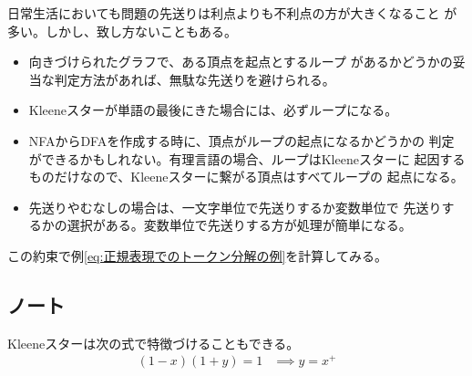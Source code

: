 {	\begin{todo}[先送り戦略]\label{todo:先送り戦略} %
		日常生活においても問題の先送りは利点よりも不利点の方が大きくなること
		が多い。しかし、致し方ないこともある。
		\begin{itemize}\setlength{\itemsep}{-1mm} %
			\item 向きづけられたグラフで、ある頂点を起点とするループ
			があるかどうかの妥当な判定方法があれば、無駄な先送りを避けられる。
			\item Kleeneスターが単語の最後にきた場合には、必ずループになる。
			\item NFAからDFAを作成する時に、頂点がループの起点になるかどうかの
			判定ができるかもしれない。有理言語の場合、ループはKleeneスターに
			起因するものだけなので、Kleeneスターに繋がる頂点はすべてループの
			起点になる。
			\item 先送りやむなしの場合は、一文字単位で先送りするか変数単位で
			先送りするかの選択がある。変数単位で先送りする方が処理が簡単になる。
		\end{itemize} %
	\end{todo} %

	この約束で例\eqref{eq:正規表現でのトークン分解の例}を計算してみる。
\subsection{ノート}\label{s2:ノート} %
	Kleeneスターは次の式で特徴づけることもできる。
	\begin{equation*}\begin{split}
		(1 - x)(1 + y) = 1 &\implies y = x^+
	\end{split}\end{equation*}
}\endgroup %
